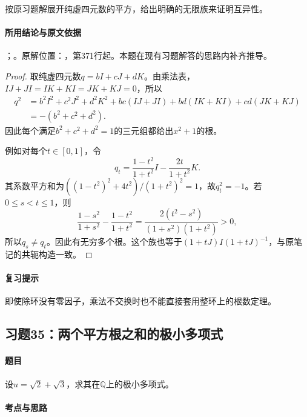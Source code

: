 按原习题解展开纯虚四元数的平方，给出明确的无限族来证明互异性。

\paragraph{所用结论与原文依据}

；。原解位置：，第371行起。本题在现有习题解答的思路内补齐推导。


\begin{proof}

取纯虚四元数$q=bI+cJ+dK$。由乘法表，$IJ+JI=IK+KI=JK+KJ=0$，所以
\begin{align*}
q^2&=b^2I^2+c^2J^2+d^2K^2
+bc(IJ+JI)+bd(IK+KI)+cd(JK+KJ)\\
&=-(b^2+c^2+d^2).
\end{align*}
因此每个满足$b^2+c^2+d^2=1$的三元组都给出$x^2+1$的根。

例如对每个$t\in[0,1]$，令
\[
q_t=\frac{1-t^2}{1+t^2}I-\frac{2t}{1+t^2}K.
\]
其系数平方和为$((1-t^2)^2+4t^2)/(1+t^2)^2=1$，故$q_t^2=-1$。若$0\le s<t\le1$，则
\[
\frac{1-s^2}{1+s^2}-\frac{1-t^2}{1+t^2}
=\frac{2(t^2-s^2)}{(1+s^2)(1+t^2)}>0,
\]
所以$q_s\ne q_t$。因此有无穷多个根。这个族也等于$(1+tJ)I(1+tJ)^{-1}$，与原笔记的共轭构造一致。

\end{proof}

\paragraph{复习提示}

即使除环没有零因子，乘法不交换时也不能直接套用整环上的根数定理。



\subsection{习题35：两个平方根之和的极小多项式}

\label{ex:3:35}

\paragraph{题目}

设$u=\sqrt2+\sqrt3$，求其在$\mathbb Q$上的极小多项式。

\paragraph{考点与思路}

